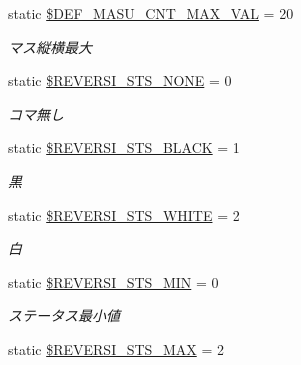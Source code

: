 \begin{DoxyCompactItemize}
static \hyperlink{class_reversi_const_ac57be288e8fbde4a2e620609ce02925b}{\$\+D\+E\+F\+\_\+\+M\+A\+S\+U\+\_\+\+C\+N\+T\+\_\+\+M\+A\+X\+\_\+\+V\+AL} = 20
\begin{DoxyCompactList}\small\item\em マス縦横最大 \end{DoxyCompactList}\item 
\mbox{\label{class_reversi_const_aafea7fe2f84562cd883a884285ded09c}} 
static \hyperlink{class_reversi_const_aafea7fe2f84562cd883a884285ded09c}{\$\+R\+E\+V\+E\+R\+S\+I\+\_\+\+S\+T\+S\+\_\+\+N\+O\+NE} = 0
\begin{DoxyCompactList}\small\item\em コマ無し \end{DoxyCompactList}\item 
\mbox{\label{class_reversi_const_a02fbb6f48064d833739f11e6c166d342}} 
static \hyperlink{class_reversi_const_a02fbb6f48064d833739f11e6c166d342}{\$\+R\+E\+V\+E\+R\+S\+I\+\_\+\+S\+T\+S\+\_\+\+B\+L\+A\+CK} = 1
\begin{DoxyCompactList}\small\item\em 黒 \end{DoxyCompactList}\item 
\mbox{\label{class_reversi_const_a7d7cce1f800aec960277bcfafe5eb9c2}} 
static \hyperlink{class_reversi_const_a7d7cce1f800aec960277bcfafe5eb9c2}{\$\+R\+E\+V\+E\+R\+S\+I\+\_\+\+S\+T\+S\+\_\+\+W\+H\+I\+TE} = 2
\begin{DoxyCompactList}\small\item\em 白 \end{DoxyCompactList}\item 
\mbox{\label{class_reversi_const_aa0e0852db16c70abcbf8b55b9bccfedc}} 
static \hyperlink{class_reversi_const_aa0e0852db16c70abcbf8b55b9bccfedc}{\$\+R\+E\+V\+E\+R\+S\+I\+\_\+\+S\+T\+S\+\_\+\+M\+IN} = 0
\begin{DoxyCompactList}\small\item\em ステータス最小値 \end{DoxyCompactList}\item 
\mbox{\label{class_reversi_const_abe1166d89a529d2a7f9bd235e14e9b64}} 
static \hyperlink{class_reversi_const_abe1166d89a529d2a7f9bd235e14e9b64}{\$\+R\+E\+V\+E\+R\+S\+I\+\_\+\+S\+T\+S\+\_\+\+M\+AX} = 2

\end{DoxyCompactItemize}
